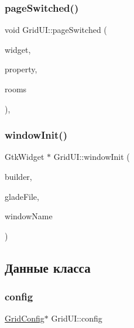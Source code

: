 \subsubsection{\texorpdfstring{page\+Switched()}{pageSwitched()}}
{\footnotesize\ttfamily void Grid\+U\+I\+::page\+Switched (\begin{DoxyParamCaption}\item[{Gtk\+Widget $\ast$}]{widget,  }\item[{G\+Param\+Spec $\ast$}]{property,  }\item[{vector$<$ \hyperlink{class_room}{Room} $\ast$$>$ $\ast$}]{rooms }\end{DoxyParamCaption})\hspace{0.3cm}{\ttfamily [static]}, {\ttfamily [private]}}

\mbox{\label{class_grid_u_i_a343652c0de7cd608a047ebad38c7a46c}} 
\subsubsection{\texorpdfstring{window\+Init()}{windowInit()}}
{\footnotesize\ttfamily Gtk\+Widget $\ast$ Grid\+U\+I\+::window\+Init (\begin{DoxyParamCaption}\item[{Gtk\+Builder $\ast$$\ast$}]{builder,  }\item[{string}]{glade\+File,  }\item[{string}]{window\+Name }\end{DoxyParamCaption})\hspace{0.3cm}{\ttfamily [private]}}



\subsection{Данные класса}
\mbox{\label{class_grid_u_i_aa25b4477bce884bea5e53a1d8df61bd6}} 
\subsubsection{\texorpdfstring{config}{config}}
{\footnotesize\ttfamily \hyperlink{class_grid_config}{Grid\+Config}$\ast$ Grid\+U\+I\+::config}

